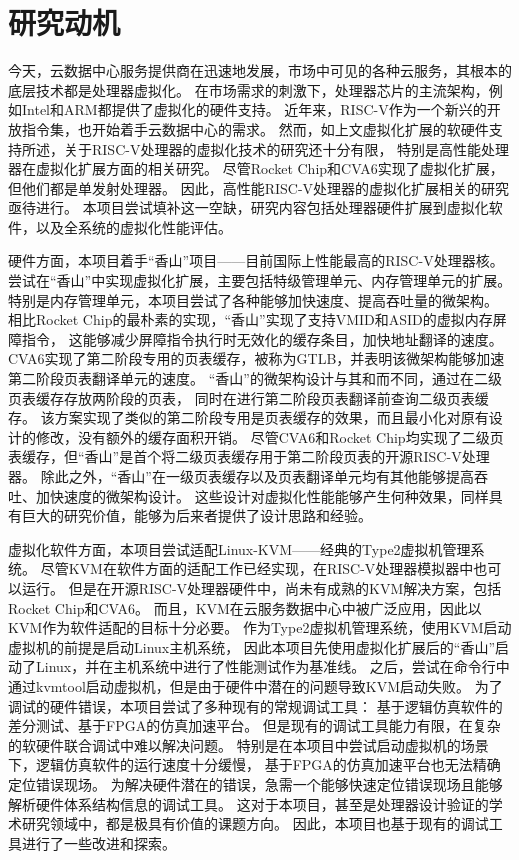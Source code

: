 \section{研究动机}

今天，云数据中心服务提供商在迅速地发展，市场中可见的各种云服务，其根本的底层技术都是处理器虚拟化。
在市场需求的刺激下，处理器芯片的主流架构，例如Intel和ARM都提供了虚拟化的硬件支持。
近年来，RISC-V作为一个新兴的开放指令集，也开始着手云数据中心的需求。
然而，如上文虚拟化扩展的软硬件支持所述，关于RISC-V处理器的虚拟化技术的研究还十分有限，
特别是高性能处理器在虚拟化扩展方面的相关研究。
尽管Rocket Chip和CVA6实现了虚拟化扩展，但他们都是单发射处理器。
因此，高性能RISC-V处理器的虚拟化扩展相关的研究亟待进行。
本项目尝试填补这一空缺，研究内容包括处理器硬件扩展到虚拟化软件，以及全系统的虚拟化性能评估。

硬件方面，本项目着手“香山”项目——目前国际上性能最高的RISC-V处理器核。
尝试在“香山”中实现虚拟化扩展，主要包括特级管理单元、内存管理单元的扩展。
特别是内存管理单元，本项目尝试了各种能够加快速度、提高吞吐量的微架构。
相比Rocket Chip的最朴素的实现，“香山”实现了支持VMID和ASID的虚拟内存屏障指令，
这能够减少屏障指令执行时无效化的缓存条目，加快地址翻译的速度。
CVA6实现了第二阶段专用的页表缓存，被称为GTLB，并表明该微架构能够加速第二阶段页表翻译单元的速度。
“香山”的微架构设计与其和而不同，通过在二级页表缓存存放两阶段的页表，
同时在进行第二阶段页表翻译前查询二级页表缓存。
该方案实现了类似的第二阶段专用是页表缓存的效果，而且最小化对原有设计的修改，没有额外的缓存面积开销。
尽管CVA6和Rocket Chip均实现了二级页表缓存，但“香山”是首个将二级页表缓存用于第二阶段页表的开源RISC-V处理器。
除此之外，“香山”在一级页表缓存以及页表翻译单元均有其他能够提高吞吐、加快速度的微架构设计。
这些设计对虚拟化性能能够产生何种效果，同样具有巨大的研究价值，能够为后来者提供了设计思路和经验。

虚拟化软件方面，本项目尝试适配Linux-KVM——经典的Type2虚拟机管理系统。
尽管KVM在软件方面的适配工作已经实现，在RISC-V处理器模拟器中也可以运行。
但是在开源RISC-V处理器硬件中，尚未有成熟的KVM解决方案，包括Rocket Chip和CVA6。
而且，KVM在云服务数据中心中被广泛应用，因此以KVM作为软件适配的目标十分必要。
作为Type2虚拟机管理系统，使用KVM启动虚拟机的前提是启动Linux主机系统，
因此本项目先使用虚拟化扩展后的“香山”启动了Linux，并在主机系统中进行了性能测试作为基准线。
之后，尝试在命令行中通过kvmtool启动虚拟机，但是由于硬件中潜在的问题导致KVM启动失败。
为了调试的硬件错误，本项目尝试了多种现有的常规调试工具：
基于逻辑仿真软件的差分测试、基于FPGA的仿真加速平台。
但是现有的调试工具能力有限，在复杂的软硬件联合调试中难以解决问题。
特别是在本项目中尝试启动虚拟机的场景下，逻辑仿真软件的运行速度十分缓慢，
基于FPGA的仿真加速平台也无法精确定位错误现场。
为解决硬件潜在的错误，急需一个能够快速定位错误现场且能够解析硬件体系结构信息的调试工具。
这对于本项目，甚至是处理器设计验证的学术研究领域中，都是极具有价值的课题方向。
因此，本项目也基于现有的调试工具进行了一些改进和探索。